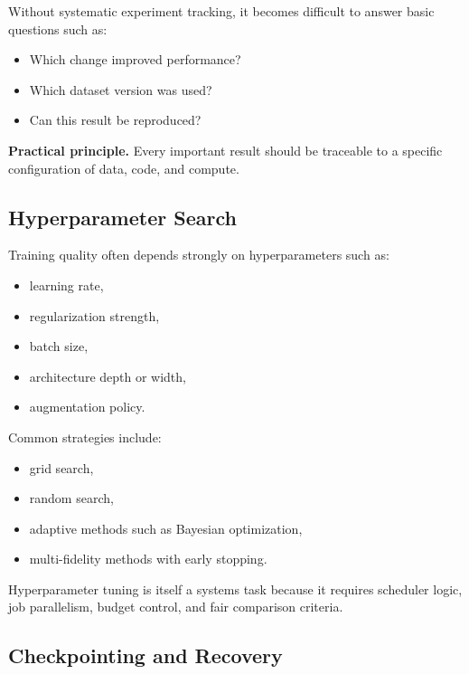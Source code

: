 \medskip

\noindent
Without systematic experiment tracking, it becomes difficult to answer basic questions such as:
\begin{itemize}
    \item Which change improved performance?
    \item Which dataset version was used?
    \item Can this result be reproduced?
\end{itemize}

\medskip

\noindent
\textbf{Practical principle.}
Every important result should be traceable to a specific configuration of data, code, and compute.

\subsection{Hyperparameter Search}

Training quality often depends strongly on hyperparameters such as:
\begin{itemize}
    \item learning rate,
    \item regularization strength,
    \item batch size,
    \item architecture depth or width,
    \item augmentation policy.
\end{itemize}

\medskip

\noindent
Common strategies include:
\begin{itemize}
    \item grid search,
    \item random search,
    \item adaptive methods such as Bayesian optimization,
    \item multi-fidelity methods with early stopping.
\end{itemize}

\medskip

\noindent
Hyperparameter tuning is itself a systems task because it requires scheduler logic, job parallelism, budget control, and fair comparison criteria.

\subsection{Checkpointing and Recovery}

